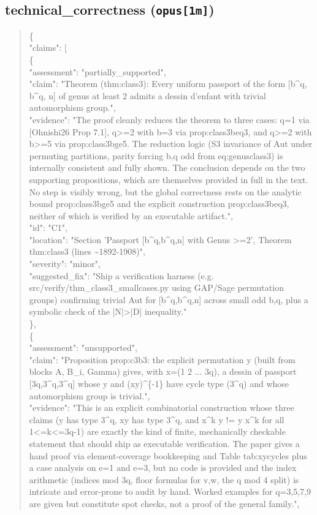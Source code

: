 \documentclass[11pt]{article}
\begin{document}
\subsection*{technical\_correctness (\texttt{opus[1m]})}
\begin{quote}\small\ttfamily\raggedright
\{\\
  "claims": [\\
    \{\\
      "assessment": "partially\_supported",\\
      "claim": "Theorem (thm:class3): Every uniform passport of the form [b\^{}q, b\^{}q, n] of genus at least 2 admits a dessin d'enfant with trivial automorphism group.",\\
      "evidence": "The proof cleanly reduces the theorem to three cases: q=1 via [Ohnishi26 Prop 7.1], q>=2 with b=3 via prop:class3beq3, and q>=2 with b>=5 via prop:class3bge5. The reduction logic (S3 invariance of Aut under permuting partitions, parity forcing b,q odd from eq:genusclass3) is internally consistent and fully shown. The conclusion depends on the two supporting propositions, which are themselves provided in full in the text. No step is visibly wrong, but the global correctness rests on the analytic bound prop:class3bge5 and the explicit construction prop:class3beq3, neither of which is verified by an executable artifact.",\\
      "id": "C1",\\
      "location": "Section 'Passport [b\^{}q,b\^{}q,n] with Genus >=2', Theorem thm:class3 (lines \~{}1892-1908)",\\
      "severity": "minor",\\
      "suggested\_fix": "Ship a verification harness (e.g. src/verify/thm\_class3\_smallcases.py using GAP/Sage permutation groups) confirming trivial Aut for [b\^{}q,b\^{}q,n] across small odd b,q, plus a symbolic check of the |N|>|D| inequality."\\
    \},\\
    \{\\
      "assessment": "unsupported",\\
      "claim": "Proposition prop:c3b3: the explicit permutation y (built from blocks A, B\_i, Gamma) gives, with x=(1 2 ... 3q), a dessin of passport [3q,3\^{}q,3\^{}q] whose y and (xy)\^{}\{-1\} have cycle type (3\^{}q) and whose automorphism group is trivial.",\\
      "evidence": "This is an explicit combinatorial construction whose three claims (y has type 3\^{}q, xy has type 3\^{}q, and x\^{}k y != y x\^{}k for all 1<=k<=3q-1) are exactly the kind of finite, mechanically checkable statement that should ship as executable verification. The paper gives a hand proof via element-coverage bookkeeping and Table tab:xycycles plus a case analysis on e=1 and e=3, but no code is provided and the index arithmetic (indices mod 3q, floor formulas for v,w, the q mod 4 split) is intricate and error-prone to audit by hand. Worked examples for q=3,5,7,9 are given but constitute spot checks, not a proof of the general family.",\\

\end{quote}
\end{document}
